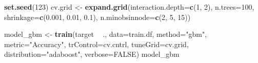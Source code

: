 \documentclass[]{article}
\newenvironment{Shaded}{\begin{snugshade}}{\end{snugshade}}
\newcommand{\DataTypeTok}[1]{\textcolor[rgb]{0.13,0.29,0.53}{#1}}
\newcommand{\DecValTok}[1]{\textcolor[rgb]{0.00,0.00,0.81}{#1}}
\newcommand{\FloatTok}[1]{\textcolor[rgb]{0.00,0.00,0.81}{#1}}
\newcommand{\KeywordTok}[1]{\textcolor[rgb]{0.13,0.29,0.53}{\textbf{#1}}}
\newcommand{\NormalTok}[1]{#1}
\newcommand{\OperatorTok}[1]{\textcolor[rgb]{0.81,0.36,0.00}{\textbf{#1}}}
\newcommand{\OtherTok}[1]{\textcolor[rgb]{0.56,0.35,0.01}{#1}}
\newcommand{\StringTok}[1]{\textcolor[rgb]{0.31,0.60,0.02}{#1}}
\begin{document}
\begin{Shaded}
\begin{Highlighting}[]
\KeywordTok{set.seed}\NormalTok{(}\DecValTok{123}\NormalTok{)}
\NormalTok{cv.grid <-}\StringTok{ }\KeywordTok{expand.grid}\NormalTok{(}\DataTypeTok{interaction.depth=}\KeywordTok{c}\NormalTok{(}\DecValTok{1}\NormalTok{, }\DecValTok{2}\NormalTok{),}
                       \DataTypeTok{n.trees=}\DecValTok{100}\NormalTok{,}
                       \DataTypeTok{shrinkage=}\KeywordTok{c}\NormalTok{(}\FloatTok{0.001}\NormalTok{, }\FloatTok{0.01}\NormalTok{, }\FloatTok{0.1}\NormalTok{),}
                       \DataTypeTok{n.minobsinnode=}\KeywordTok{c}\NormalTok{(}\DecValTok{2}\NormalTok{, }\DecValTok{5}\NormalTok{, }\DecValTok{15}\NormalTok{))}

\NormalTok{model_gbm <-}\StringTok{ }\KeywordTok{train}\NormalTok{(target }\OperatorTok{~}\StringTok{ }\NormalTok{., }\DataTypeTok{data=}\NormalTok{train.df,}
                  \DataTypeTok{method=}\StringTok{"gbm"}\NormalTok{,}
                  \DataTypeTok{metric=}\StringTok{"Accuracy"}\NormalTok{,}
                  \DataTypeTok{trControl=}\NormalTok{cv.cntrl,}
                  \DataTypeTok{tuneGrid=}\NormalTok{cv.grid,}
                  \DataTypeTok{distribution=}\StringTok{"adaboost"}\NormalTok{,}
                  \DataTypeTok{verbose=}\OtherTok{FALSE}\NormalTok{)}
\NormalTok{model_gbm}
\end{Highlighting}
\end{Shaded}
\end{document}
